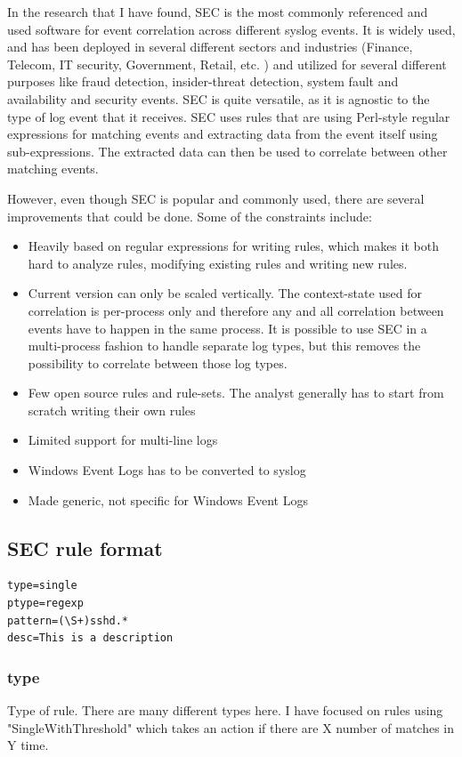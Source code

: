 In the research that I have found, SEC is the most commonly referenced and used software for event correlation across different syslog events. It is widely used, and has been deployed in several different sectors and industries (Finance, Telecom, IT security, Government, Retail, etc. \textcite{vaarandi2005tools}) and utilized for several different purposes like fraud detection, insider-threat detection, system fault and availability and security events. SEC is quite versatile, as it is agnostic to the type of log event that it receives. SEC uses rules that are using Perl-style regular expressions for matching events and extracting data from the event itself using sub-expressions. The extracted data can then be used to correlate between other matching events.

However, even though SEC is popular and commonly used, there are several improvements that could be done. Some of the constraints include:
\begin{itemize}
    \item Heavily based on regular expressions for writing rules, which makes it both hard to analyze rules, modifying existing rules and writing new rules.
    \item Current version can only be scaled vertically. The context-state used for correlation is per-process only and therefore any and all correlation between events have to happen in the same process. It is possible to use SEC in a multi-process fashion to handle separate log types, but this removes the possibility to correlate between those log types. 
    \item Few open source rules and rule-sets. The analyst generally has to start from scratch writing their own rules
    \item Limited support for multi-line logs
    \item Windows Event Logs has to be converted to syslog
    \item Made generic, not specific for Windows Event Logs
\end{itemize}


\subsection{SEC rule format}
\begin{lstlisting}
type=single
ptype=regexp
pattern=(\S+)sshd.*
desc=This is a description
\end{lstlisting}

\subsubsection{type}
Type of rule. There are many different types here.
I have focused on rules using "SingleWithThreshold" which takes an action if there are X number of matches in Y time.

